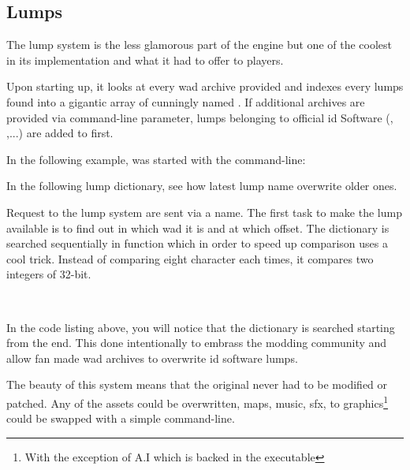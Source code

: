 \subsection{Lumps}
The lump system is the less glamorous part of the engine but one of the coolest in its implementation and what it had to offer to players.\\
\par
Upon starting up, it looks at every wad archive provided and indexes every lumps found into a gigantic array of  cunningly named . 
If additional archives are provided via  command-line parameter, lumps belonging to official id Software (, ,...) are added to  first.\\
\par
In the following example, \doom was started with the command-line:\\
\par
{}
\par
In the following lump dictionary, see how latest lump name overwrite older ones.\\
\par
{}
\par
Request to the lump system are sent via a  name. The first task to make the lump available is to find out in which wad it is and at which offset. The dictionary is searched sequentially in function  which in order to speed up comparison uses a cool trick. Instead of comparing eight character each times, it compares two integers of 32-bit.\\
\par
{}\\
\par
In the code listing above, you will notice that the dictionary is searched starting from the end. This done intentionally to embrass the modding community and allow fan made wad archives to overwrite id software lumps.\\
\par
The beauty of this system means that the original  never had to be modified or patched. Any of the assets could be overwritten, maps, music, sfx, to graphics\footnote{With the exception of A.I which is backed in the executable} could be swapped with a simple command-line.\\
